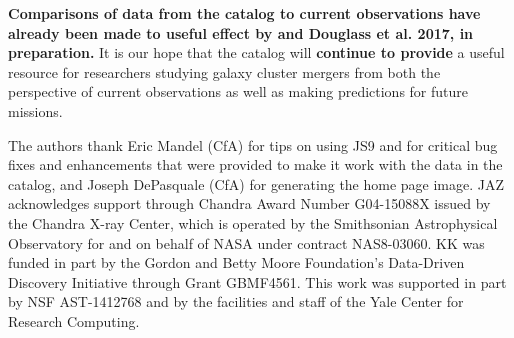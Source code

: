 \documentclass{emulateapj}
\begin{document}
{\bf Comparisons of data from the catalog to current observations have already been made to useful effect by \citet{wal17} and Douglass et al. 2017, in preparation.} It is our hope that the catalog will {\bf continue to provide} a useful resource for researchers studying galaxy cluster mergers from both the perspective of current observations as well as making predictions for future missions. 

\acknowledgements
The authors thank Eric Mandel (CfA) for tips on using JS9 and for critical bug fixes and enhancements that were provided to make it work with the data in the catalog, and Joseph DePasquale (CfA) for generating the home page image. JAZ acknowledges support through Chandra Award Number G04-15088X issued by the Chandra X-ray Center, which is operated by the Smithsonian Astrophysical Observatory for and on behalf of NASA under contract NAS8-03060. KK was funded in part by the Gordon and Betty Moore Foundation's Data-Driven Discovery Initiative through Grant GBMF4561. This work was supported in part by NSF AST-1412768 and by the facilities and staff of the Yale Center for Research Computing.
\end{document}
